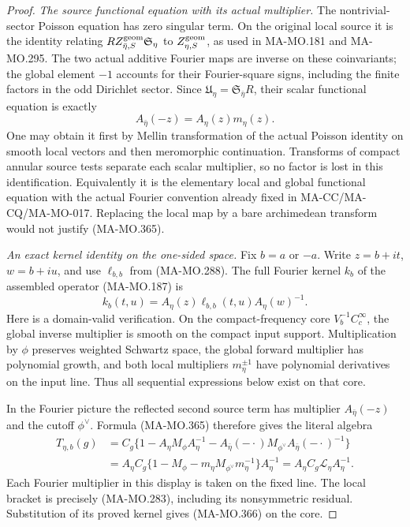 \begin{proof}
\emph{The source functional equation with its actual multiplier.}
The nontrivial-sector Poisson equation has zero singular term.
On the original local source it is the identity relating
\(RZ^{\rm geom}_{\bar\eta,S}\mathfrak S_\eta\) to
\(Z^{\rm geom}_{\eta,S}\), as used in MA-MO.181 and
MA-MO.295.  The two actual additive Fourier maps are inverse
on these coinvariants; the global element \(-1\) accounts
for their Fourier-square signs, including the finite factors
in the odd Dirichlet sector.  Since
\(\mathfrak U_\eta=\mathfrak S_{\bar\eta}R\), their
scalar functional equation is exactly
\[
                     A_{\bar\eta}(-z)=A_\eta(z)m_\eta(z).
 \tag{MA-MO.365}
\]
One may obtain it first by Mellin transformation of the actual
Poisson identity on smooth local vectors and then meromorphic
continuation.  Transforms of compact annular source tests
separate each scalar multiplier, so no factor is lost in this
identification.  Equivalently it is the elementary local and
global functional equation with the actual Fourier convention
already fixed in MA-CC/MA-CQ/MA-MO-017.  Replacing the local
map by a bare archimedean transform would not justify (MA-MO.365).

\emph{An exact kernel identity on the one-sided space.}
Fix \(b=a\) or \(-a\).  Write \(z=b+it\), \(w=b+iu\),
and use \(\ell_{b,b}\) from (MA-MO.288).  The full Fourier
kernel \(k_b\) of the assembled operator (MA-MO.187) is
\[
                k_b(t,u)=A_\eta(z)\ell_{b,b}(t,u)
                                             A_\eta(w)^{-1}.
 \tag{MA-MO.366}
\]
Here is a domain-valid verification.  On the compact-frequency
core \(V_b^{-1}C_c^\infty\), the global inverse multiplier
is smooth on the compact input support.  Multiplication by
\(\phi\) preserves weighted Schwartz space, the global
forward multiplier has polynomial growth, and both local
multipliers \(m_\eta^{\pm1}\) have polynomial derivatives
on the input line.  Thus all sequential expressions below
exist on that core.

In the Fourier picture the reflected second source term has
multiplier \(A_{\bar\eta}(-z)\) and the cutoff
\(\phi^\vee\).  Formula (MA-MO.365) therefore gives the
literal algebra
\[
 \begin{aligned}
 T_{\eta,b}(g)
 &=C_g\{1-A_\eta M_\phi A_\eta^{-1}
          -A_{\bar\eta}(-\cdot)M_{\phi^\vee}
                                  A_{\bar\eta}(-\cdot)^{-1}\}\\
 &=A_\eta C_g\{1-M_\phi-m_\eta M_{\phi^\vee}
                         m_\eta^{-1}\}A_\eta^{-1}
   =A_\eta C_g\mathcal L_\eta A_\eta^{-1}.
 \end{aligned}
 \tag{MA-MO.367}
\]
Each Fourier multiplier in this display is taken on the fixed
line.  The local bracket is precisely (MA-MO.283), including
its nonsymmetric residual.  Substitution of its proved kernel
gives (MA-MO.366) on the core.


\end{proof}
